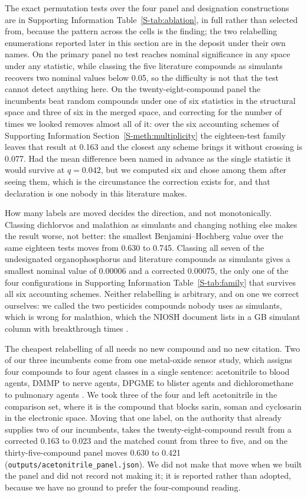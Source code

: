 \documentclass[journal=ancham,manuscript=article,margin=1in]{achemso}
\begin{document}
The exact permutation tests over the four panel and designation constructions
are in Supporting Information Table~\ref{S-tab:ablation}, in full rather than
selected from, because the pattern across the cells is the finding; the two
relabelling enumerations reported later in this section are in the deposit
under their own names. On the primary panel no test reaches
nominal significance in any space under any statistic, while classing the five
literature compounds as simulants recovers two nominal values below 0.05, so the
difficulty is not that the test cannot detect anything here. On the
twenty-eight-compound panel the incumbents beat random compounds under one of
six statistics in the structural space and three of six in the merged space, and
correcting for the number of times we looked removes almost all of it: over the
six accounting schemes of Supporting Information
Section~\ref{S-meth:multiplicity} the eighteen-test family leaves that result at
0.163 and the closest any scheme brings it without crossing is 0.077. Had the
mean difference been named in advance as the single statistic it would survive
at $q=0.042$, but we computed six and chose among them after seeing them,
which is the circumstance the correction exists for, and that declaration is one
nobody in this literature makes.

How many labels are moved decides the direction, and not monotonically. Classing
dichlorvos and malathion as simulants and changing nothing else makes the result
worse, not better: the smallest Benjamini--Hochberg value over the same eighteen
tests moves from 0.630 to 0.745. Classing all seven of the undesignated
organophosphorus and literature compounds as simulants gives a smallest nominal
value of 0.00006 and a corrected 0.00075, the only one of the four
configurations in Supporting Information Table~\ref{S-tab:family} that survives
all six accounting schemes. Neither relabelling is arbitrary, and on one we
correct ourselves: we called the two pesticides compounds nobody uses as
simulants, which is wrong for malathion, which the NIOSH document lists in a GB
simulant column with breakthrough times \cite{niosh2002simulant}.

The cheapest relabelling of all needs no new compound and no new citation. Two
of our three incumbents come from one metal-oxide sensor study, which assigns
four compounds to four agent classes in a single sentence: acetonitrile to blood
agents, DMMP to nerve agents, DPGME to blister agents and dichloromethane to
pulmonary agents \cite{lee2011sno2}. We took three of the four and left
acetonitrile in the comparison set, where it is the compound that blocks sarin,
soman and cyclosarin in the electronic space. Moving that one label, on the
authority that already supplies two of our incumbents, takes the
twenty-eight-compound result from a corrected 0.163 to 0.023 and the matched
count from three to five, and on the thirty-five-compound panel moves 0.630 to
0.421 (\texttt{outputs/acetonitrile\_panel.json}). We did not make that move
when we built the panel and did not record not making it; it is reported rather
than adopted, because we have no ground to prefer the four-compound reading.
\end{document}
